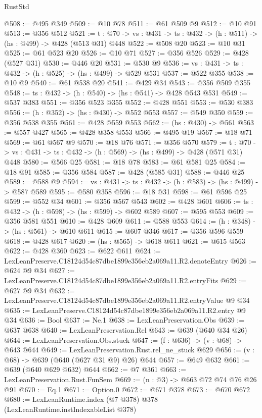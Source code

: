 \begin{lexlean}{RustStd}
\begin{coremodule}
@508 := @495 @349
@509 := @10 @78
@511 := @61 @509 @9
@512 := @10 @91
@513 := @356 @512
@521 := {t : @70} -> {vs : @431} -> {ts : @432} -> (h : @511) -> (hs : @499) -> @428 (@513 @31) @448
@522 := @508 @20
@523 := @10 @31
@525 := @61 @523 @20
@526 := @10 @71
@527 := @356 @526
@529 := @428 (@527 @31)
@530 := @446 @20
@531 := @530 @9
@536 := {vs : @431} -> {ts : @432} -> (h : @525) -> (hs : @499) -> @529 @531
@537 := @522 @355
@538 := @10 @9
@540 := @61 @538 @20
@541 := @429 @34
@543 := @356 @509 @355
@548 := {ts : @432} -> (h : @540) -> (hs : @541) -> @428 @543 @531
@549 := @537 @383
@551 := @356 @523 @355
@552 := @428 @551
@553 := @530 @383
@556 := (h : @352) -> (hs : @430) -> @552 @553
@557 := @549 @350
@559 := @356 @538 @355
@561 := @428 @559 @553
@562 := (hs : @430) -> @561
@563 := @557 @427
@565 := @428 @358 @553
@566 := @495 @19
@567 := @18 @71
@569 := @61 @567 @9
@570 := @18 @76
@571 := @356 @570
@579 := {t : @70} -> {vs : @431} -> {ts : @432} -> (h : @569) -> (hs : @499) -> @428 (@571 @31) @448
@580 := @566 @25
@581 := @18 @78
@583 := @61 @581 @25
@584 := @18 @91
@585 := @356 @584
@587 := @428 (@585 @31)
@588 := @446 @25
@589 := @588 @9
@594 := {vs : @431} -> {ts : @432} -> (h : @583) -> (hs : @499) -> @587 @589
@595 := @580 @358
@596 := @18 @31
@598 := @61 @596 @25
@599 := @552 @34
@601 := @356 @567 @543
@602 := @428 @601
@606 := {ts : @432} -> (h : @598) -> (hs : @599) -> @602 @589
@607 := @595 @553
@609 := @356 @581 @551
@610 := @428 @609
@611 := @588 @553
@614 := (h : @348) -> (hs : @561) -> @610 @611
@615 := @607 @346
@617 := @356 @596 @559
@618 := @428 @617
@620 := (hs : @565) -> @618 @611
@621 := @615 @563
@622 := @428 @360
@623 := @622 @611
@624 := LexLeanPreserve.C18124d54c87dbe1899e356eb2a069a11.R2.denoteEntry
@626 := @624 @9 @34
@627 := LexLeanPreserve.C18124d54c87dbe1899e356eb2a069a11.R2.entryFits
@629 := @627 @9 @34
@632 := LexLeanPreserve.C18124d54c87dbe1899e356eb2a069a11.R2.entryValue @9 @34
@635 := LexLeanPreserve.C18124d54c87dbe1899e356eb2a069a11.R2.entry @9 @34
@636 := Bool
@637 := Ne.{1}
@638 := LexLeanPreservation.Obs
@639 := @637 @638
@640 := LexLeanPreservation.Rel
@643 := @639 (@640 @34 @26)
@644 := LexLeanPreservation.Obs.stuck
@647 := (f : @636) -> (v : @68) -> @643 @644
@649 := LexLeanPreservation.Rust.rel_ne_stuck @629
@656 := (v : @68) -> @639 (@640 (@627 @31 @9) @26) @644
@657 := @649 @632
@661 := @639 (@640 @629 @632) @644
@662 := @7 @361
@663 := LexLeanPreservation.Rust.FunSem
@669 := (n : @3) -> @663 @72 @74 @76 @26 @91
@670 := Eq.{1}
@671 := Option.{0}
@672 := @671 @378
@673 := @670 @672
@680 := LexLeanRuntime.index (@7 @378) @378 (LexLeanRuntime.instIndexableList @378)

\end{coremodule}
\end{lexlean}
